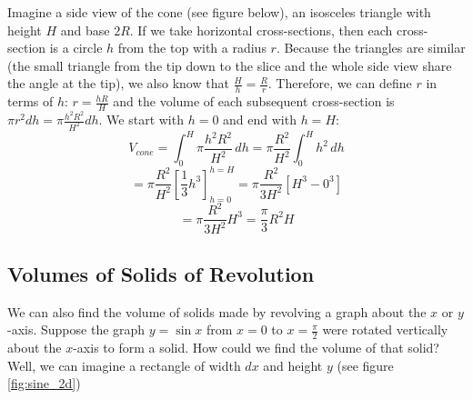 \begin{Answer}[ref = volume3]
Imagine a side view of the cone (see figure below), an isosceles triangle with 
height $H$ and base $2R$. If we take horizontal cross-sections, then each 
cross-section is a circle $h$ from the top with a radius $r$. Because the 
triangles are similar (the small triangle from the tip down to the slice and the whole side view share the angle at the tip), we also know 
that $\frac{H}{h} = \frac{R}{r}$. Therefore, we can define $r$ in terms of $h$:
$r = \frac{hR}{H}$ and the volume of each subsequent cross-section is $\pi r^2 
dh = \pi \frac{h^2 R^2}{H^2} dh$. We start with $h = 0$ and end with $h = H$:
$$V_{cone} = \int_0^H \pi \frac{h^2 R^2}{H^2}\,dh = \pi \frac{R^2}{H^2} \int_0^
H h^2\,dh$$
$$= \pi \frac{R^2}{H^2} \left[ \frac{1}{3}h^3 \right]_{h = 0}^{h = H} = \pi 
\frac{R^2}{3H^2} \left[H^3 - 0^3 \right]$$
$$= \pi \frac{R^2}{3H^2}H^3 = \frac{\pi}{3} R^2 H$$

\begin{center}
\end{center}
\end{Answer}

\subsection{Volumes of Solids of Revolution}
We can also find the volume of solids made by revolving a graph about the $x$ 
or $y$-axis. Suppose the graph $y = \sin{x}$ from $x = 0$ to $x = \frac{\pi}{2
}$ were rotated vertically about the $x$-axis to form a solid. How could we 
find the volume of that solid? Well, we can imagine a rectangle of width $dx$ 
and height $y$ (see figure \ref{fig:sine_2d})

